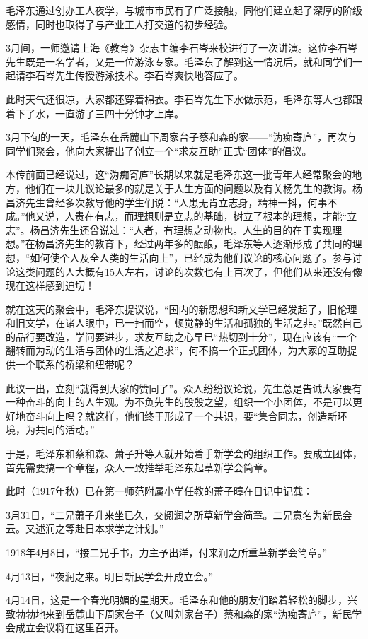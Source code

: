\documentclass[../../dazhuan.tex]{subfiles}
\begin{document}
毛泽东通过创办工人夜学，与城市市民有了广泛接触，同他们建立起了深厚的阶级感情，同时也取得了与产业工人打交道的初步经验。

3月间，一师邀请上海《教育》杂志主编李石岑来校进行了一次讲演。这位李石岑先生既是一名学者，又是一位游泳专家。毛泽东了解到这一情况后，就和同学们一起请李石岑先生传授游泳技术。李石岑爽快地答应了。

此时天气还很凉，大家都还穿着棉衣。李石岑先生下水做示范，毛泽东等人也都跟着下了水，一直游了三四十分钟才上岸。

3月下旬的一天，毛泽东在岳麓山下周家台子蔡和森的家——“沩痴寄庐”，再次与同学们聚会，他向大家提出了创立一个“求友互助”正式“团体”的倡议。

本传前面已经说过，这“沩痴寄庐”长期以来就是毛泽东这一批青年人经常聚会的地方，他们在一块儿议论最多的就是关于人生方面的问题以及有关杨先生的教诲。杨昌济先生曾经多次教导他的学生们说：“人患无肯立志身，精神一抖，何事不成。”他又说，人贵在有志，而理想则是立志的基础，树立了根本的理想，才能“立志”。杨昌济先生还曾说过：“人者，有理想之动物也。人生的目的在于实现理想。”在杨昌济先生的教育下，经过两年多的酝酿，毛泽东等人逐渐形成了共同的理想，“如何使个人及全人类的生活向上”，已经成为他们议论的核心问题了。参与讨论这类问题的人大概有15人左右，讨论的次数也有上百次了，但他们从来还没有像现在这样感到迫切！

就在这天的聚会中，毛泽东提议说，“国内的新思想和新文学已经发起了，旧伦理和旧文学，在诸人眼中，已一扫而空，顿觉静的生活和孤独的生活之非。”既然自己的品行要改造，学问要进步，求友互助之心早已“热切到十分”，现在应该有“一个翻转而为动的生活与团体的生活之追求”，何不搞一个正式团体，为大家的互助提供一个联系的桥梁和纽带呢？

此议一出，立刻“就得到大家的赞同了”。众人纷纷议论说，先生总是告诫大家要有一种奋斗的向上的人生观。为不负先生的殷殷之望，组织一个小团体，不是可以更好地奋斗向上吗？就这样，他们终于形成了一个共识，要“集合同志，创造新环境，为共同的活动。”

于是，毛泽东和蔡和森、萧子升等人就开始着手新学会的组织工作。要成立团体，首先需要搞一个章程，众人一致推举毛泽东起草新学会简章。

此时（1917年秋）已在第一师范附属小学任教的萧子暲在日记中记载：

3月31日，“二兄萧子升来坐已久，交阅润之所草新学会简章。二兄意名为新民会云。又述润之等赴日本求学之计划。”

1918年4月8日，“接二兄手书，力主予出洋，付来润之所重草新学会简章。”

4月13日，“夜润之来。明日新民学会开成立会。”

4月14日，这是一个春光明媚的星期天。毛泽东和他的朋友们踏着轻松的脚步，兴致勃勃地来到岳麓山下周家台子（又叫刘家台子）蔡和森的家“沩痴寄庐”，新民学会成立会议将在这里召开。
\end{document}
